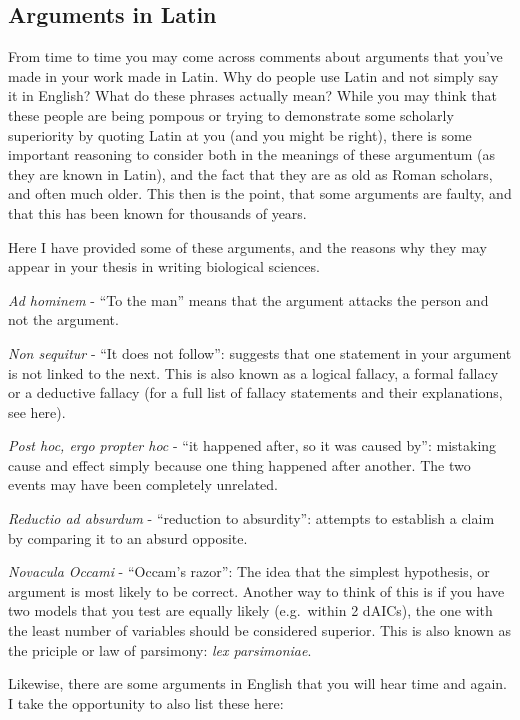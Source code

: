 \documentclass[
]{krantz}
\begin{document}
\hypertarget{arguments-in-latin}{%
\subsection{Arguments in Latin}\label{arguments-in-latin}}

From time to time you may come across comments about arguments that you've made in your work made in Latin. Why do people use Latin and not simply say it in English? What do these phrases actually mean? While you may think that these people are being pompous or trying to demonstrate some scholarly superiority by quoting Latin at you (and you might be right), there is some important reasoning to consider both in the meanings of these argumentum (as they are known in Latin), and the fact that they are as old as Roman scholars, and often much older. This then is the point, that some arguments are faulty, and that this has been known for thousands of years.

Here I have provided some of these arguments, and the reasons why they may appear in your thesis in writing biological sciences.

\emph{Ad hominem} - ``To the man'' means that the argument attacks the person and not the argument.

\emph{Non sequitur} - ``It does not follow'': suggests that one statement in your argument is not linked to the next. This is also known as a logical fallacy, a formal fallacy or a deductive fallacy (for a full list of fallacy statements and their explanations, see here).

\emph{Post hoc, ergo propter hoc} - ``it happened after, so it was caused by'': mistaking cause and effect simply because one thing happened after another. The two events may have been completely unrelated.

\emph{Reductio ad absurdum} - ``reduction to absurdity'': attempts to establish a claim by comparing it to an absurd opposite.

\emph{Novacula Occami} - ``Occam's razor'': The idea that the simplest hypothesis, or argument is most likely to be correct. Another way to think of this is if you have two models that you test are equally likely (e.g.~within 2 dAICs), the one with the least number of variables should be considered superior. This is also known as the priciple or law of parsimony: \emph{lex parsimoniae}.

Likewise, there are some arguments in English that you will hear time and again. I take the opportunity to also list these here:
\end{document}
